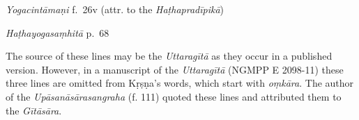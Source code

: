 \begin{ekdosis}
\begin{testimonia}[hp04_049]
\emph{Yogacintāmaṇi} f.~26v (attr. to the \emph{Haṭhapradīpikā})
\begin{versinnote}
\end{versinnote}

\emph{Haṭhayogasaṃhitā} p.~68
\begin{versinnote}
\end{versinnote}
\end{testimonia}

\begin{philcomm}[hp04_049]
The source of these lines may be the \emph{Uttaragītā} as they occur in a published version. However, in a manuscript of the \emph{Uttaragītā} (NGMPP E 2098-11) these three lines are omitted from Kṛṣṇa's words, which start with \emph{oṃkāra}. The author of the \emph{Upāsanāsārasangraha} (f. 111) quoted these lines and attributed them to the \emph{Gītāsāra}. 



\end{philcomm}
\end{ekdosis}
